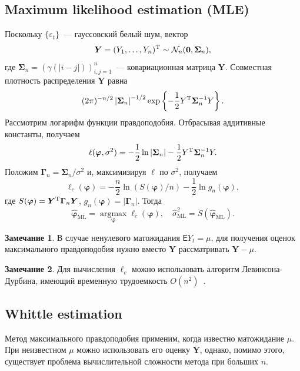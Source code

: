 \documentclass[specialist,
substylefile = spbu_report.rtx,
subf,href,colorlinks=true, 12pt]{disser}
\theoremstyle{definition}
\newtheorem{remark}{Замечание}[section]
\begin{document}
\subsection{Maximum likelihood estimation (MLE)}
Поскольку $\{\varepsilon_t\}$~--- гауссовский белый шум, вектор
\[
	\bm Y=(Y_1,\ldots,Y_n)^{\mathrm{T}}\sim \mathcal{N}_n(\bm0, \bm\Sigma_n),
\]
где $\bm\Sigma_n=(\gamma(|i-j|))_{i,j=1}^n$~--- ковариационная матрица $\bm Y$. Совместная плотность распределения $\bm Y$ равна
\[
	(2\pi)^{-n/2}\left|\bm\Sigma_n\right|^{-1/2}\exp\left\{-\frac12Y^{\mathrm{T}}\bm\Sigma_n^{-1}Y\right\}.
\]
Рассмотрим логарифм функции правдоподобия. Отбрасывая аддитивные константы, получаем
\[
	\ell(\bm\varphi, \sigma^2)=-\frac12\ln\left|\bm\Sigma_n\right|-\frac12 Y^{\mathrm{T}} \bm\Sigma_n^{-1} Y.
\]
Положим $\bm\Gamma_n=\bm\Sigma_n / \sigma^2$ и, максимизируя $\ell$ по $\sigma^2$, получаем
\begin{equation}\label{eq:mle_objective}
	\ell_c(\bm\varphi)=-\frac{n}{2}\ln\left(S(\bm\varphi) / n\right) - \frac{1}{2}\ln g_n(\bm\varphi),
\end{equation}
где $S(\bm\varphi)=\bm Y^{\mathrm{T}} \bm\Gamma_n\bm Y$, $g_n(\bm\varphi)=\left|\bm\Gamma_n\right|$.
Тогда
\[
	\widehat{\bm\varphi}_\mathrm{ML}=\operatorname*{argmax}\limits_{\bm\varphi}\ell_c(\bm\varphi),\quad \widehat\sigma^2_\mathrm{ML} = S(\widehat{\bm\varphi}_\mathrm{ML}).
\]

\begin{remark}
	В случае ненулевого матожидания $\mathsf{E}Y_t=\mu$, для получения оценок максимального правдоподобия нужно вместо $\bm Y$ рассматривать $\bm Y-\mu$.
\end{remark}
\begin{remark}
	Для вычисления $\ell_c$ можно использовать алгоритм Левинсона-Дурбина, имеющий временную трудоемкость $O(n^2)$~\cite{McLeod2007}.
\end{remark}
\subsection{Whittle estimation}
Метод максимального правдоподобия применим, когда известно матожидание $\mu$. При неизвестном $\mu$ можно использовать его оценку $\overline{\bm Y}$, однако, помимо этого, существует проблема вычислительной сложности метода при больших $n$.
\end{document}
